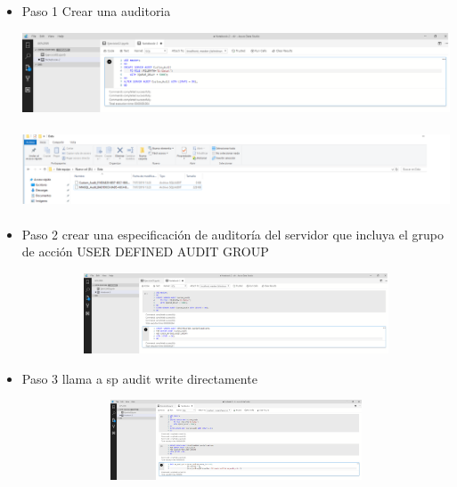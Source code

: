 \begin{itemize}  


			\item Paso 1 Crear una auditoria
				 
				 	
					\begin{center}
    				\includegraphics[width=16cm, height=90]{./Imagenes/Imagen__20}
   				    \end{center}
   				    
   				     \begin{center}
    				\includegraphics[width=16cm, height=90]{./Imagenes/AuditoriaCreada2}
   				    \end{center}
   				    
   		   \item Paso 2 crear una especificación de auditoría del servidor que incluya el grupo de acción USER DEFINED AUDIT GROUP
				 
				 	
					\begin{center}
    				\includegraphics[width=16cm, height=90]{./Imagenes/Imagen__21}
   				    \end{center}
   				    
   		   \item Paso 3 llama a sp audit write directamente
				 
				 	
					\begin{center}
    				\includegraphics[width=16cm, height=90]{./Imagenes/Imagen__22}
   				    \end{center}
   				    

\end{itemize}
